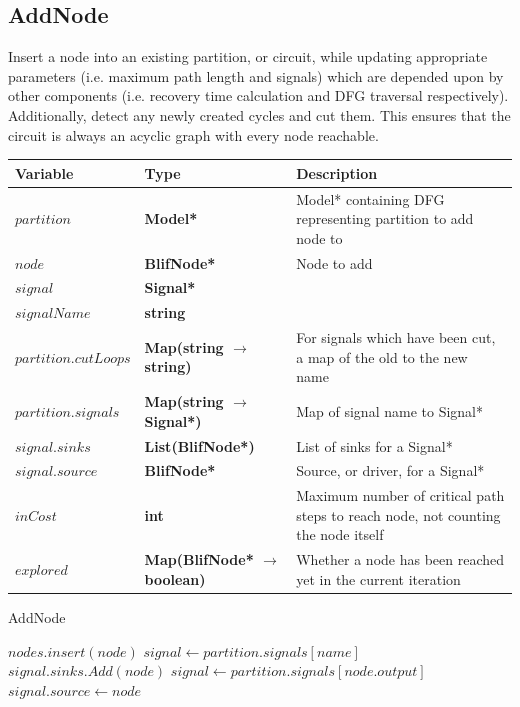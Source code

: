 \documentclass[12pt,final,oneside]{article} %
\begin{document}
\newpage
\subsection{AddNode}
Insert a node into an existing partition, or circuit, while updating appropriate parameters (i.e. maximum path length and signals) which are depended upon by other components (i.e. recovery time calculation and \ac{DFG} traversal respectively).
Additionally, detect any newly created cycles and cut them.
This ensures that the circuit is always an acyclic graph with every node reachable.
\begin{algorithm}
    \begin{center}
        \begin{tabularx}{\linewidth}{llX}
        \toprule
        Variable & Type & Description\\
        \midrule
        $partition$ &\bf  Model* & Model* containing DFG representing partition to add node to\\
        $node$ &\bf  BlifNode* & Node to add\\
        $signal$ &\bf  Signal* & \\
        $signalName$ &\bf  string & \\
        $partition.cutLoops$ &\bf  Map(string $\to$ string) & For signals which have been cut, a map of the old to the new name\\
        $partition.signals$ &\bf  Map(string $\to$ Signal*) & Map of signal name to Signal* \\
        $signal.sinks$ &\bf  List(BlifNode*) & List of sinks for a Signal* \\
        $signal.source$ &\bf  BlifNode* & Source, or driver, for a Signal* \\
        $inCost$ &\bf  int & Maximum number of critical path steps to reach node, not counting the node itself \\
        $explored$ &\bf  Map(BlifNode* $\to$ boolean) & Whether a node has been reached yet in the current iteration \\ 
        \bottomrule
        \end{tabularx}
    \end{center}
   \caption{AddNode}\label{addnode}
   \begin{algorithmic}[1]
            \State $nodes.insert(node)$
               \State $signal \gets partition.signals[name]$
               \State $signal.sinks.Add(node)$
            \EndFor
            \State $signal \gets partition.signals[node.output]$
            \State $signal.source \gets node$


\end{algorithmic}
\end{algorithm}
\end{document}
